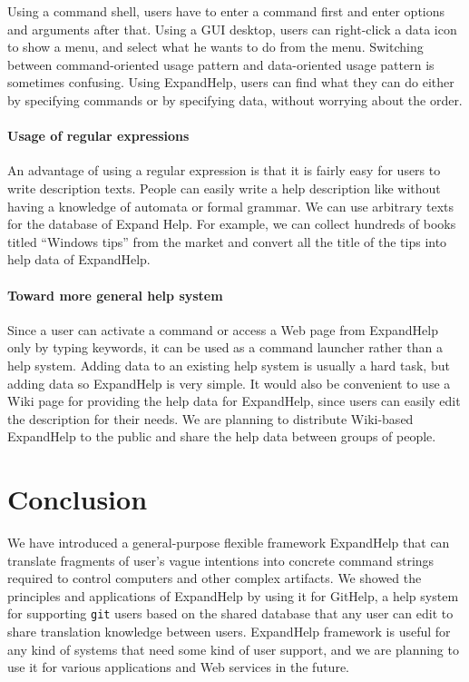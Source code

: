 \documentclass{sigchi}
\def\GH{\textsf{GitHelp}}
\def\EH{\textsf{ExpandHelp}}
\def\GIT{\texttt{git}}
\begin{document}
Using a command shell,
users have to enter a command first and enter options and arguments after that.
Using a GUI desktop,
users can right-click a data icon to show a menu,
and select what he wants to do from the menu.
Switching between command-oriented usage pattern and
data-oriented usage pattern is sometimes confusing.
Using {\EH}, users can find what they can do
either by specifying commands or by specifying data, 
without worrying about the order.

\paragraph{Usage of regular expressions}

An advantage of using a regular expression is that
it is fairly easy for users to write description texts.
People can easily write a help description like
without having a knowledge of automata or formal grammar.
We can use arbitrary texts for the database of Expand Help.
For example,
we can collect hundreds of books titled ``Windows tips'' from the market
and convert all the title of the tips into help data of ExpandHelp.

\paragraph{Toward more general help system}

Since a user can activate a command or access a Web page
from ExpandHelp only by typing keywords,
it can be used as a command launcher rather than a help system.
Adding data to an existing help system is usually a hard task,
but adding data so ExpandHelp is very simple.
It would also be convenient to use a Wiki page for providing the help
data for ExpandHelp, since users can easily edit the description
for their needs.
We are planning to distribute Wiki-based ExpandHelp to the public and
share the help data between groups of people.

\section{Conclusion}

We have introduced a general-purpose flexible framework {\EH}
that can translate fragments of user's vague intentions into
concrete command strings required to control computers and
other complex artifacts.
We showed the principles and applications of {\EH} by using it
for {\GH}, a help system for supporting {\GIT} users
based on the shared database that any user can edit to share
translation knowledge between users.
%
{\EH} framework is useful for any kind of systems that need
some kind of user support, and we are planning to use it
for various applications and Web services in the future.
\end{document}

